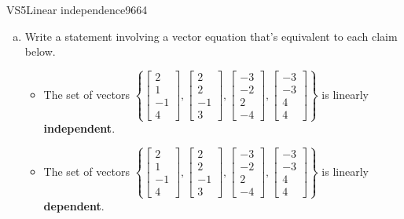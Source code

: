 \begin{exercise}{VS5}{Linear independence}{9664} 
\begin{exerciseStatement} 

\begin{enumerate}[(a)]
\item  

 Write a statement involving a vector equation that's equivalent to each claim below. 

 

\begin{itemize}
\item  

 The set of vectors \(\left\{ \left[\begin{array}{c}
2 \\
1 \\
-1 \\
4
\end{array}\right] , \left[\begin{array}{c}
2 \\
2 \\
-1 \\
3
\end{array}\right] , \left[\begin{array}{c}
-3 \\
-2 \\
2 \\
-4
\end{array}\right] , \left[\begin{array}{c}
-3 \\
-3 \\
4 \\
4
\end{array}\right] \right\}\) is linearly \textbf{independent}. 

 
\item  

 The set of vectors \(\left\{ \left[\begin{array}{c}
2 \\
1 \\
-1 \\
4
\end{array}\right] , \left[\begin{array}{c}
2 \\
2 \\
-1 \\
3
\end{array}\right] , \left[\begin{array}{c}
-3 \\
-2 \\
2 \\
-4
\end{array}\right] , \left[\begin{array}{c}
-3 \\
-3 \\
4 \\
4
\end{array}\right] \right\}\) is linearly \textbf{dependent}. 


\end{itemize}
\end{enumerate}
\end{exerciseStatement}
\end{exercise}
